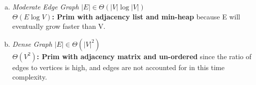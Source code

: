 \documentclass[11pt]{article}
\begin{document}
\begin{enumerate}
\begin{enumerate}[(a)]
			\item
				\textit{Moderate Edge Graph $ |E| \in \Theta(|V| \log{|V|}) $} \\
				\textbf{$ \Theta(E \log V) $: Prim with adjacency list and min-heap} because E will eventually grow faster than V. \\

			\item
				\textit{Dense Graph $ |E| \in \Theta(|V|^2) $} \\
				\textbf{$ \Theta(V^2) $: Prim with adjacency matrix and un-ordered} since the ratio of edges to vertices is high, and edges are not accounted for in this time complexity. \\
				
		\end{enumerate}


\end{enumerate}
\end{document}
